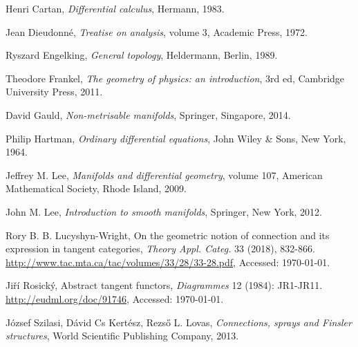 \documentclass[11pt,a4paper,twoside,openany]{report}
\theoremstyle{my-theorem}
\theoremstyle{non-theorem}
\begin{document}
	\newpage
	\begin{thebibliography}{20}
		 Henri Cartan, \emph{Differential calculus}, Hermann, 1983.
		
		 Jean Dieudonn\'{e}, \emph{Treatise on analysis}, volume 3, Academic Press, 1972.
		
		 Ryszard Engelking, \emph{General topology}, Heldermann, Berlin, 1989.
		
		 Theodore Frankel, \textit{The geometry of physics: an introduction}, 3rd ed, Cambridge University Press, 2011.
		
		 David Gauld, \emph{Non-metrisable manifolds}, Springer, Singapore, 2014.
		
		 Philip Hartman, \emph{Ordinary differential equations}, John Wiley \& Sons, New York, 1964.
		
		
		 Jeffrey M. Lee, \emph{Manifolds and differential geometry}, volume 107, American Mathematical Society, Rhode Island, 2009.
		
		 John M. Lee, \emph{Introduction to smooth manifolds}, Springer, New York, 2012.
		
		 Rory B. B. Lucyshyn-Wright, On the geometric notion of connection and its expression in tangent categories, \emph{Theory Appl. Categ.} 33 (2018), 832-866. \url{http://www.tac.mta.ca/tac/volumes/33/28/33-28.pdf}, Accessed: \monthyeardate\today.
		
		 Jiří Rosický, Abstract tangent functors, \emph{Diagrammes} 12 (1984): JR1-JR11. \url{http://eudml.org/doc/91746}, Accessed: \monthyeardate\today.
		
		 J\'{o}zsef Szilasi, D\'{a}vid Cs Kert\'{e}sz, Rezs\H{o} L. Lovas, \emph{Connections, sprays and Finsler structures}, World Scientific Publishing
		Company, 2013.
		
	\end{thebibliography}
	
	\printindex
	
	\appendix
	
\end{document}
